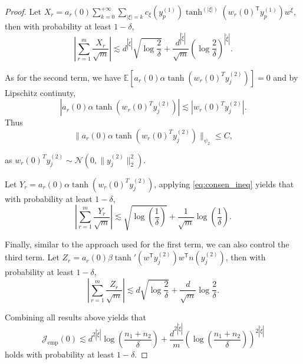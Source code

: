 \documentclass{article}
\newcommand{\T}{\mathsf{T}}
\begin{document}
\begin{proof}
   Let $X_r=a_r(0)\sum_{k=0}^{+\infty} \sum_{|\xi|=k} c_{\xi}(y_p^{(1)}) \tanh^{(|\xi|)}(w_r(0)^\T y_p^{(1)})w^{\xi}$, then with probability at least $1-\delta$,
	\begin{equation*}
        \left|\sum\limits_{r=1}^m \frac{X_r}{\sqrt{m}}\right|\lesssim d^{|\tilde{\xi}|}\sqrt{\log\frac{2}{\delta}} + \frac{d^{|\tilde{\xi}|}}{\sqrt{m}}\left(\log\frac{2}{\delta}\right)^{|\tilde{\xi}|}. 
    \end{equation*}

    As for the second term, we have
     $\mathbb{E}[a_r(0)\alpha\tanh(w_r(0)^T y_j^{(2)})]=0$ and by Lipschitz continuty,
	\begin{equation*}
          |a_r(0)\alpha\tanh(w_r(0)^T y_j^{(2)})|\lesssim |w_r(0)^T y_j^{(2)}|.
    \end{equation*}
	Thus
	\begin{equation*}
         \| a_r(0)\alpha\tanh(w_r(0)^T y_j^{(2)})\|_{\psi_2} \leq C,
    \end{equation*}
    
   as $w_r(0)^T y_j^{(2)}\sim \mathcal{N}(0,\|y_j^{(2)}\|_2^2)$.

	Let $Y_r=a_r(0)\alpha\tanh(w_r(0)^T y_j^{(2)})$, applying \cref{eq:consen_ineq} yields that with probability at least $1-\delta$,
	\begin{equation*}
        \left|\sum\limits_{r=1}^m \frac{Y_r}{\sqrt{m}}\right|\lesssim \sqrt{\log\left(\frac{1}{\delta}\right)} + \frac{1}{\sqrt{m}} \log\left(\frac{1}{\delta}\right).
    \end{equation*}
    
    Finally, similar to the approach used for the first term, we can also control the third term.
	Let $Z_r=a_r(0)\beta \tanh'(w^\T y_{j}^{(2)})w^\T n(y_{j}^{(2)})$, then with probability at least $1-\delta$,
	\begin{equation*}
        \left|\sum\limits_{r=1}^m \frac{Z_r}{\sqrt{m}}\right|\lesssim d\sqrt{\log\frac{2}{\delta}} + \frac{d}{\sqrt{m}}\log\frac{2}{\delta}. 
    \end{equation*}

    Combining all results above yields that
	\begin{equation*}
        \mathcal{J}_{\text{emp}}(0)\lesssim d^{2|\tilde{\xi}|}\log\left(\frac{n_1+n_2}{\delta}\right)+\frac{d^{2|\tilde{\xi}|}}{m} \left(\log\left(\frac{n_1+n_2}{\delta}\right)\right)^{2|\tilde{\xi}|}  
    \end{equation*}
   holds with probability at least $1-\delta$.
\end{proof}
\end{document}
